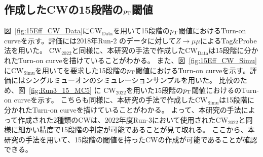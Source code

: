 \subsection{作成したCWの15段階の$p_{\rm{T}}$閾値}
図~\ref{fig:15Eff_CW_Data}に$\mathrm{CW_{Data}}$を用いて15段階の$p_{\rm{T}}$閾値におけるTurn-on curveを示す。評価には2018年Run-2 のデータに対して$Z\rightarrow \mu\mu$によるTag$\&$Probe法を用いた。
$\mathrm{CW_{2022}}$と同様に、本研究の手法で作成した$\mathrm{CW_{Data}}$は15段階に分かれたTurn-on curveを描けていることがわかる。
また、図~\ref{fig:15Eff_CW_Simu}に$\mathrm{CW_{Simu}}$を用いてを要求した15段階の$p_{\rm{T}}$閾値におけるTurn-on curveを示す。評価にはシングルミューオンのシミュレーションサンプルを用いた。
比較のため、図~\ref{fig:Run3_15_MC5} に $\mathrm{CW_{2022}}$を用いた15段階の$p_{\rm{T}}$閾値におけるのTurn-on curveを示す。
こちらも同様に、本研究の手法で作成した$\mathrm{CW_{Simu}}$は15段階に分かれたTurn-on curveを描けていることがわかる。
よって、本研究の手法によって作成された2種類のCWは、2022年度Run-3において使用された$\mathrm{CW_{2022}}$と同様に細かい精度で15段階の判定が可能であることが見て取れる。
ここから、本研究の手法を用いて、15段階の閾値を持ったCWの作成が可能であることが確認できる。

